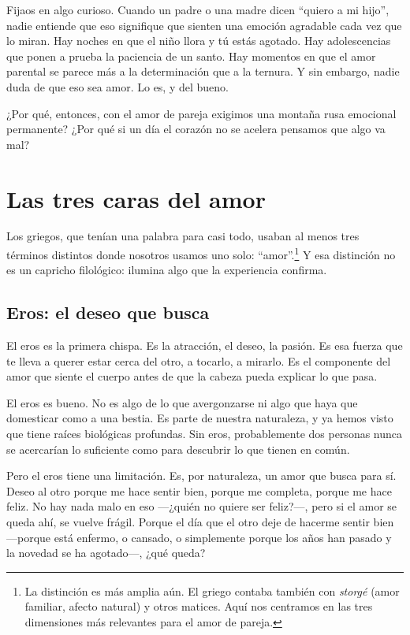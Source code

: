 Fijaos en algo curioso. Cuando un padre o una madre dicen ``quiero a mi hijo'', nadie entiende que eso signifique que sienten una emoción agradable cada vez que lo miran. Hay noches en que el niño llora y tú estás agotado. Hay adolescencias que ponen a prueba la paciencia de un santo. Hay momentos en que el amor parental se parece más a la determinación que a la ternura. Y sin embargo, nadie duda de que eso sea amor. Lo es, y del bueno.

¿Por qué, entonces, con el amor de pareja exigimos una montaña rusa emocional permanente? ¿Por qué si un día el corazón no se acelera pensamos que algo va mal?

\section{Las tres caras del amor}

Los griegos, que tenían una palabra para casi todo, usaban al menos tres términos distintos donde nosotros usamos uno solo: ``amor''.\footnote{La distinción es más amplia aún. El griego contaba también con \textit{storgé} (amor familiar, afecto natural) y otros matices. Aquí nos centramos en las tres dimensiones más relevantes para el amor de pareja.} Y esa distinción no es un capricho filológico: ilumina algo que la experiencia confirma.

\subsection*{Eros: el deseo que busca}

El eros es la primera chispa. Es la atracción, el deseo, la pasión. Es esa fuerza que te lleva a querer estar cerca del otro, a tocarlo, a mirarlo. Es el componente del amor que siente el cuerpo antes de que la cabeza pueda explicar lo que pasa.

El eros es bueno. No es algo de lo que avergonzarse ni algo que haya que domesticar como a una bestia. Es parte de nuestra naturaleza, y ya hemos visto que tiene raíces biológicas profundas. Sin eros, probablemente dos personas nunca se acercarían lo suficiente como para descubrir lo que tienen en común.

Pero el eros tiene una limitación. Es, por naturaleza, un amor que busca para sí. Deseo al otro porque me hace sentir bien, porque me completa, porque me hace feliz. No hay nada malo en eso ---¿quién no quiere ser feliz?---, pero si el amor se queda ahí, se vuelve frágil. Porque el día que el otro deje de hacerme sentir bien ---porque está enfermo, o cansado, o simplemente porque los años han pasado y la novedad se ha agotado---, ¿qué queda?

